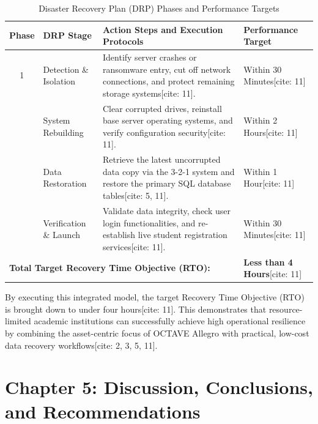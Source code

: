 \documentclass[journal,onecolumn,12pt,twoside]{IEEEtran}
\begin{document}
	\begin{table}[htbp]
		\caption{Disaster Recovery Plan (DRP) Phases and Performance Targets}
		\label{tab:drp_phases}
		\centering
		\begin{tabular}{c l p{7cm} l}
			\toprule
			\textbf{Phase} & \textbf{DRP Stage} & \textbf{Action Steps and Execution Protocols} & \textbf{Performance Target} \\
			\midrule
			1 & Detection \& Isolation & Identify server crashes or ransomware entry, cut off network connections, and protect remaining storage systems[cite: 11]. & Within 30 Minutes[cite: 11] \\
			\addlinespace
			2 & System Rebuilding & Clear corrupted drives, reinstall base server operating systems, and verify configuration security[cite: 11]. & Within 2 Hours[cite: 11] \\
			\addlinespace
			3 & Data Restoration & Retrieve the latest uncorrupted data copy via the 3-2-1 system and restore the primary SQL database tables[cite: 5, 11]. & Within 1 Hour[cite: 11] \\
			\addlinespace
			4 & Verification \& Launch & Validate data integrity, check user login functionalities, and re-establish live student registration services[cite: 11]. & Within 30 Minutes[cite: 11] \\
			\midrule
			\multicolumn{3}{l}{\textbf{Total Target Recovery Time Objective (RTO):}} & \textbf{Less than 4 Hours}[cite: 11] \\
			\bottomrule
		\end{tabular}
	\end{table}
	
	By executing this integrated model, the target Recovery Time Objective (RTO) is brought down to under four hours[cite: 11]. This demonstrates that resource-limited academic institutions can successfully achieve high operational resilience by combining the asset-centric focus of OCTAVE Allegro with practical, low-cost data recovery workflows[cite: 2, 3, 5, 11].
	
	\newpage
	\section{Chapter 5: Discussion, Conclusions, and Recommendations}
	\label{sec:discussion}
	
\end{document}
